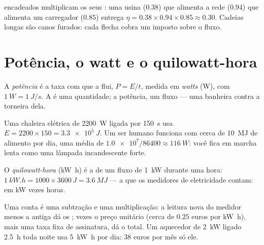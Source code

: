 \begin{remark}\label{rem:g10:energy-conservation:chain-eta}
 encadeados multiplicam os seus : uma usina
($0.38$) que alimenta a rede ($0.94$) que alimenta um carregador
($0.85$) entrega $\eta = 0.38 \times 0.94 \times 0.85 \approx 0.30$.
Cadeias longas são canos furados: cada flecha cobra um imposto sobre o
fluxo.
\end{remark}

\section{Potência, o watt e o quilowatt-hora}

\begin{definition}[Potência]\label{def:g10:energy-conservation:power}
A \emph{potência} é a taxa com que a  flui,
$P = E/t$, medida em \emph{watts} (\unit{W}), com
$\qty{1}{W} = \qty{1}{J/s}$. A  é uma quantidade; a potência, um
fluxo --- uma banheira contra a torneira dela.
\end{definition}

\begin{example}\label{ex:g10:energy-conservation:power}
Uma chaleira elétrica de \qty{2200}{W} ligada por \qty{150}{s} usa
$E = 2200 \times 150 = \qty{3.3e5}{J}$. Um ser humano funciona com cerca
de \qty{10}{MJ} de alimento por dia, uma média de
$\num{1.0e7}/\num{86400} \approx \qty{116}{W}$: você fica em marcha lenta
como uma lâmpada incandescente forte.
\end{example}

\begin{definition}\label{def:g10:energy-conservation:kwh}
O \emph{quilowatt-hora} (\unit{kW.h}) é a 
de um fluxo de \qty{1}{kW} durante uma hora:
$\qty{1}{kW.h} = 1000 \times 3600\,\unit{J} = \qty{3.6}{MJ}$ --- a
 que os medidores de eletricidade contam:  em \unit{kW}
vezes horas.
\end{definition}

\begin{example}\label{ex:g10:energy-conservation:bill}
Uma conta é uma subtração e uma multiplicação: a leitura nova do medidor
menos a antiga dá os ; vezes o preço unitário (cerca de
$0.25$ euros por \unit{kW.h}), mais uma taxa fixa de assinatura, dá o
total. Um aquecedor de \qty{2}{kW} ligado \qty{2.5}{h} toda noite usa
\qty{5}{kW.h} por dia: $38$ euros por mês só ele.
\end{example}


